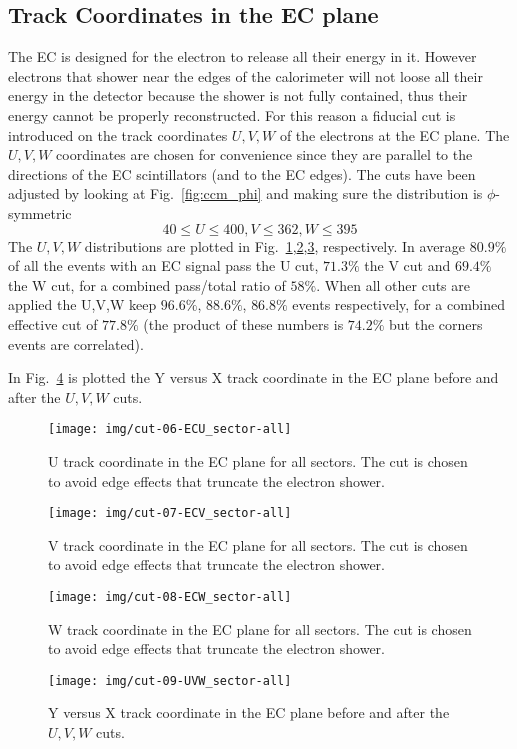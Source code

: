 \clearpage\newpage

\subsection{Track Coordinates in the EC plane}
The EC is designed for the electron to release all their energy in it.
However electrons that shower near the edges of the calorimeter will not loose
all their energy in the detector because the shower is not fully contained,
thus their energy cannot be properly reconstructed. For this reason
a fiducial cut is introduced on the track coordinates $U,V,W$
of the electrons at the EC plane. The $U,V,W$ coordinates are chosen for
convenience since they are parallel to the directions of the EC scintillators
(and to the EC edges). The cuts have been adjusted by looking at Fig.~\ref{fig:ccm_phi}
and making sure the distribution is $\phi$-symmetric
$$
40\leq U\leq400, V\leq362, W\leq395
$$
The $U,V,W$ distributions are plotted in Fig.~\ref{fig:ECu},\ref{fig:ECv},\ref{fig:ECw},
respectively. In average $80.9\%$ of all the events with an EC signal pass the U cut, $71.3\%$ the V cut
and $69.4\%$ the W cut, for a combined pass/total ratio of $58\%$. When all other cuts are applied
the U,V,W keep $96.6\%$, $88.6\%$, $86.8\%$ events respectively, for a combined effective cut of $77.8\%$
(the product of these numbers is  $74.2\%$ but the corners events are correlated).

In Fig.~\ref{fig:ECyx} is plotted the Y versus X track coordinate in the EC plane before and after
the $U,V,W$ cuts.



\clearpage
\begin{figure}[ht]
    \centering
    \texttt{[image: img/cut-06-ECU\_sector-all]}
    \caption{U track coordinate in the EC plane for all sectors. The cut is chosen to avoid
    edge effects that truncate the electron shower.}
    \label{fig:ECu}
\end{figure}
\clearpage

\clearpage
\begin{figure}[ht]
    \centering
    \texttt{[image: img/cut-07-ECV\_sector-all]}
    \caption{V track coordinate in the EC plane for all sectors. The cut is chosen to avoid
    edge effects that truncate the electron shower.}
    \label{fig:ECv}
\end{figure}

\clearpage
\begin{figure}[ht]
    \centering
    \texttt{[image: img/cut-08-ECW\_sector-all]}
    \caption{W track coordinate in the EC plane for all sectors. The cut is chosen to avoid
    edge effects that truncate the electron shower.}
    \label{fig:ECw}
\end{figure}

\begin{figure}[ht]
    \centering
    \texttt{[image: img/cut-09-UVW\_sector-all]}
    \caption{Y versus X track coordinate in the EC plane before and after
    the $U,V,W$ cuts.}
    \label{fig:ECyx}
\end{figure}

